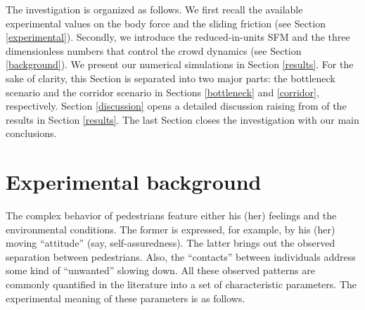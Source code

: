 \documentclass[preprint,12pt]{elsarticle}
\begin{document}
The investigation is organized as follows. We first recall the available 
experimental values on the body force and the sliding friction (see Section 
\ref{experimental}). Secondly, we introduce the reduced-in-units SFM and the 
three dimensionless numbers that control the crowd dynamics (see Section 
\ref{background}). We present our numerical simulations in Section 
\ref{results}. For the sake of clarity, this Section is 
separated into two major parts: the bottleneck scenario and the corridor 
scenario in Sections \ref{bottleneck} and \ref{corridor}, respectively. 
Section \ref{discussion} opens a detailed discussion raising from of the results 
in Section \ref{results}. The last Section closes the investigation with our 
main conclusions.

\section{\label{experimental}Experimental background}

The complex behavior of pedestrians feature either his (her) feelings and 
the environmental conditions. The former is expressed, for example, by his 
(her) moving ``attitude'' (say, self-assuredness). The latter brings out the 
observed separation between pedestrians. Also, the ``contacts'' between 
individuals address some kind of ``unwanted'' slowing down. All these 
observed patterns are commonly quantified in the literature into a set of 
characteristic  parameters. The experimental meaning of these parameters is as 
follows.
\end{document}
